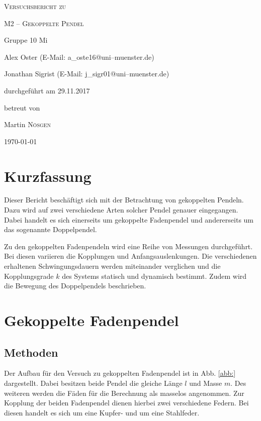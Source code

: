 \documentclass[11pt,a4paper,titlepage, ngerman]{article}
\newcommand{\refabb}[1]{Abb. \ref{abb:#1}}
\begin{document}
	\begin{titlepage}
		\centering
		{\scshape\LARGE Versuchsbericht zu \par}
		\vspace{1cm}
		{\scshape\huge M2 -- Gekoppelte Pendel\par}
		\vspace{2.5cm}
		{\LARGE Gruppe 10 Mi\par}
		\vspace{0.5cm}
		{\large Alex Oster (E-Mail: a\_oste16@uni--muenster.de) \par}
		{\large Jonathan Sigrist (E-Mail: j\_sigr01@uni--muenster.de) \par}
		\vfill
		durchgeführt am 29.11.2017\par
		betreut von\par
		{\large Martin \textsc{Nösgen}}		
		\vfill	
		{\large \today\par}
	\end{titlepage}
		
	\tableofcontents
		
	\newpage
	
	\section{Kurzfassung}
		
		Dieser Bericht beschäftigt sich mit der Betrachtung von gekoppelten Pendeln. Dazu wird auf zwei verschiedene Arten solcher Pendel genauer eingegangen. Dabei handelt es sich einerseits um gekoppelte Fadenpendel und andererseits um das sogenannte Doppelpendel. 
		
		Zu den gekoppelten Fadenpendeln wird eine Reihe von Messungen durchgeführt. Bei diesen variieren die Kopplungen und Anfangsauslenkungen. Die verschiedenen erhaltenen Schwingungsdauern werden miteinander verglichen und die Kopplungsgrade $k$ des Systems statisch und dynamisch bestimmt. Zudem wird die Bewegung des Doppelpendels beschrieben.
		
	\section{Gekoppelte Fadenpendel}
				
		
		\subsection{Methoden}
			
			Der Aufbau für den Versuch zu gekoppelten Fadenpendel ist in \refabb{} dargestellt. Dabei besitzen beide Pendel die gleiche Länge $l$ und Masse $m$. Des weiteren werden die Fäden für die Berechnung als masselos angenommen. Zur Kopplung der beiden Fadenpendel dienen hierbei zwei verschiedene Federn. Bei diesen handelt es sich um eine Kupfer- und um eine Stahlfeder.
			
\end{document}
